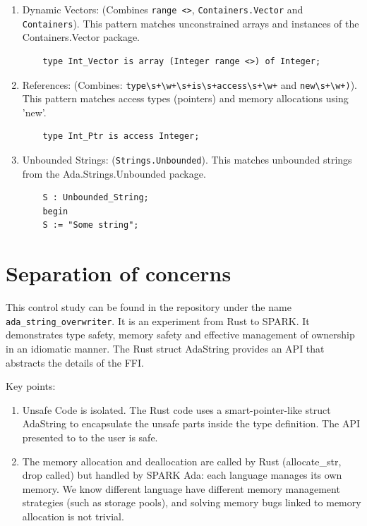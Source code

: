 \documentclass[nomenclature, english, bibtex]{kththesis}
\begin{document}
{\begin{enumerate}
    \item Dynamic Vectors: (Combines \verb|range <>|, \verb|Containers.Vector| and \verb|Containers|).
This pattern matches unconstrained arrays and instances of the Containers.Vector package.

    \begin{verbatim}
    type Int_Vector is array (Integer range <>) of Integer;
    \end{verbatim}

    \item References: (Combines: \verb|type\s+\w+\s+is\s+access\s+\w+| and \verb|new\s+\w+)|). This pattern matches access types (pointers) and memory allocations using 'new'.

    \begin{verbatim}
    type Int_Ptr is access Integer;
    \end{verbatim}

    \item Unbounded Strings: (\verb|Strings.Unbounded|). This matches unbounded strings from the Ada.Strings.Unbounded package.

    \begin{verbatim}
    S : Unbounded_String;
    begin
    S := "Some string";
    \end{verbatim}
\end{enumerate}

 

\chapter{Separation of concerns}
\label{ch:separation_of_concerns}

This control study can be found in the repository under the name \texttt{ada\_string\_overwriter}. It is an experiment from Rust to SPARK. It demonstrates type safety, memory safety and effective management of ownership in an idiomatic manner. The Rust struct AdaString provides an API that abstracts the details of the FFI. 

Key points:

\begin{enumerate}
    \item Unsafe Code is isolated. The Rust code uses a smart-pointer-like struct AdaString to encapsulate the unsafe parts inside the type definition. The API presented to to the user is safe.
    \item The memory allocation and deallocation are called by Rust (allocate\_str, drop called) but handled by SPARK Ada: each language manages its own memory. We know different language have different memory management strategies (such as storage pools), and solving memory bugs linked to memory allocation is not trivial.
   

\end{enumerate}}
\end{document}

